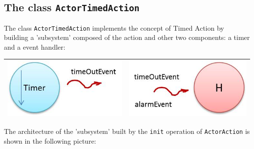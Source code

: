 \subsection{The class \texttt{ActorTimedAction}}
The class \texttt{ActorTimedAction} implements the concept of Timed Action by building a 'subsystem' composed of the action and other two components: a timer and a event handler:


\medskip 
\begin{center}
\medskip 
\begin{tabular}{|c|c|}
\hline 
\includegraphics[scale = 0.5]{img/actionTimer.jpg} & \includegraphics[scale = 0.5]{img/actionEventHandler.jpg} \\ 
\hline 
\end{tabular}
\end{center}



The architecture of the 'subsystem' built by the \texttt{init} operation of \texttt{ActorAction} is shown in the following picture:

